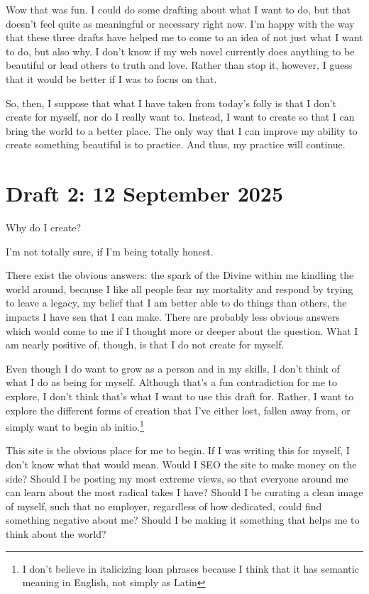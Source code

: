 \documentclass[12pt]{article}
\renewcommand{\,}{\textsuperscript{,}}
\begin{document}
Wow that was fun.
I could do some drafting about what I want to do, but that doesn't feel quite as meaningful or necessary right now.
I'm happy with the way that these three drafts have helped me to come to an idea of not just what I want to do, but also why.
I don't know if my web novel currently does anything to be beautiful or lead others to truth and love.
Rather than stop it, however, I guess that it would be better if I was to focus on that.

So, then, I suppose that what I have taken from today's folly is that I don't create for myself, nor do I really want to.
Instead, I want to create so that I can bring the world to a better place.
The only way that I can improve my ability to create something beautiful is to practice. 
And thus, my practice will continue.

\section{Draft 2: 12 September 2025}

Why do I create?

I'm not totally sure, if I'm being totally honest.

There exist the obvious answers: the spark of the Divine within me kindling the world around, because I like all people fear my mortality and respond by trying to leave a legacy, my belief that I am better able to do things than others, the impacts I have sen that I can make.  
There are probably less obvious answers which would come to me if I thought more or deeper about the question.  
What I am nearly positive of, though, is that I do not create for myself.

Even though I do want to grow as a person and in my skills, I don't think of what I do as being for myself.  
Although that's a fun contradiction for me to explore, I don't think that's what I want to use this draft for.  
Rather, I want to explore the different forms of creation that I've either lost, fallen away from, or simply want to begin ab initio.\footnote{I don't believe in italicizing loan phrases because I think that it has semantic meaning in English, not simply as Latin}

This site is the obvious place for me to begin.  
If I was writing this for myself, I don't know what that would mean.  
Would I SEO the site to make money on the side?  
Should I be posting my most extreme views, so that everyone around me can learn about the most radical takes I have?  
Should I be curating a clean image of myself, such that no employer, regardless of how dedicated, could find something negative about me?  
Should I be making it something that helps me to think about the world?
\end{document}
